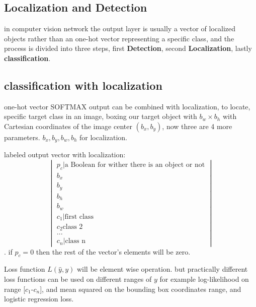\documentclass[4apaper,12pt]{book}
\begin{document}
\begin{description}
      \subsection{Localization and Detection}
      \begin{description}
      \item  in computer vision network the output layer is usually a vector of localized objects rather than an one-hot vector representing a specific class, and the process is divided into three steps, first \textbf{Detection}, second \textbf{Localization}, lastly \textbf{classification}.
        \subsection{classification with localization}
      \item  one-hot vector SOFTMAX output can be combined with localization, to locate, specific target class in an image, boxing our target object with $b_w\times {b_h}$ with Cartesian coordinates of the image center $(b_x,b_y)$, now three are 4 more parameters. $b_x, b_y,b_w, b_h$ for localization.
      \item labeled output vector with localization: $$\begin{vmatrix}p_c | \text{a Boolean for wither there is an object or not}\\
        b_x\\b_y\\b_h\\b_w\\c_1 | \text{first class}\\c_2 \text{class 2}\\...\\c_n | \text{class n}\end{vmatrix}$$. if $p_c=0$ then the rest of the vector's elements will be zero.
      \item Loss function $L(\hat{y},y)$ will be element wise operation. but practically different loss functions can be used on different ranges of  $y$ for example log-likelihood on range [$c_1$-$c_n$], and mean squared on the bounding box coordinates range, and logistic regression loss.
      \end{description}

\end{description}
\end{document}
